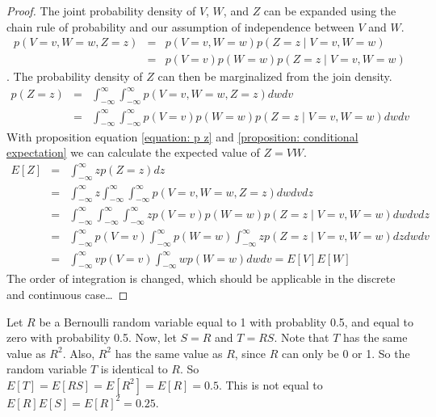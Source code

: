 \documentclass[11pt]{article}
\newcommand{\propref}[1]{\ref{proposition: #1}}
\newcommand{\eqnref}[1]{\ref{equation: #1}}
\begin{document}
\begin{proof}
    The joint probability density of $V$, $W$, and $Z$ can be expanded using the chain rule of probability and our assumption of independence between $V$ and $W$.
    \begin{eqnarray}
        p(V=v, W=w, Z=z) &=& p(V=v, W=w)p(Z=z \mid V=v,W=w) \nonumber \\
            &=& p(V=v)p(W=w)p(Z=z \mid V=v,W=w)
            \label{equation: joint density}
    \end{eqnarray}.
    The probability density of $Z$ can then be marginalized from the join density.
    \begin{eqnarray}
        p(Z=z) &=& \int_{-\infty}^{\infty} \int_{-\infty}^{\infty} p(V=v, W=w, Z=z) dwdv \nonumber \\
        &=& \int_{-\infty}^{\infty} \int_{-\infty}^{\infty} p(V=v)p(W=w)p(Z=z \mid V=v,W=w) dwdv
        \label{equation: p z}
    \end{eqnarray}
    With proposition equation \eqnref{p z} and \propref{conditional expectation} we can calculate the expected value of $Z=VW$.
    \begin{eqnarray}
        E[Z] &=& \int_{-\infty}^{\infty} zp(Z=z)dz \nonumber \\
        &=& \int_{-\infty}^{\infty} z \int_{-\infty}^{\infty} \int_{-\infty}^{\infty} p(V=v,W=w,Z=z) dwdvdz \nonumber \\
        &=& \int_{-\infty}^{\infty} \int_{-\infty}^{\infty} \int_{-\infty}^{\infty} zp(V=v)p(W=w)p(Z=z \mid V=v,W=w) dwdvdz \nonumber \\
        &=& \int_{-\infty}^{\infty} p(V=v) \int_{-\infty}^{\infty} p(W=w) \int_{-\infty}^{\infty} zp(Z=z \mid V=v,W=w) dzdwdv \nonumber \\
        &=& \int_{-\infty}^{\infty} vp(V=v) \int_{-\infty}^{\infty} wp(W=w) dw dv = E[V]E[W]
        \label{equation: z_mean}
    \end{eqnarray}
    The order of integration is changed, which should be applicable in the discrete and continuous case\dots
\end{proof}

Let $R$ be a Bernoulli random variable equal to 1 with probablity 0.5, and equal to zero with probability 0.5.
Now, let $S=R$ and $T=RS$.
Note that $T$ has the same value as $R^2$.
Also, $R^2$ has the same value as $R$, since $R$ can only be 0 or 1.
So the random variable $T$ is identical to $R$.
So $E[T]=E[RS]=E[R^2]=E[R]=0.5$. This is not equal to $E[R]E[S]=E[R]^2=0.25$.




%
%

\end{document}
